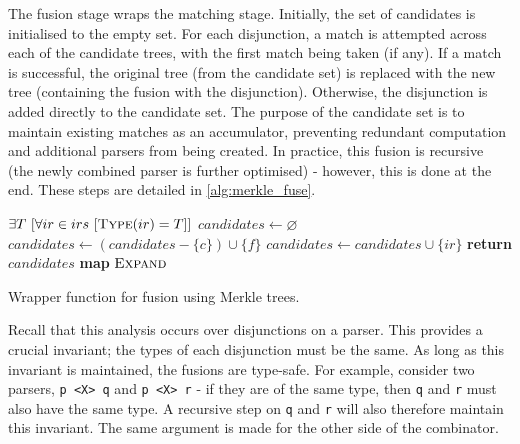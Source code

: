 The fusion stage wraps the matching stage.
Initially, the set of candidates is initialised to the empty set.
For each disjunction, a match is attempted across each of the candidate trees, with the first match being taken (if any).
If a match is successful, the original tree (from the candidate set) is replaced with the new tree (containing the fusion with the disjunction).
Otherwise, the disjunction is added directly to the candidate set.
The purpose of the candidate set is to maintain existing matches as an accumulator, preventing redundant computation and additional parsers from being created.
In practice, this fusion is recursive (the newly combined parser is further optimised) - however, this is done at the end.
These steps are detailed in \autoref{alg:merkle_fuse}.

\begin{algorithm}[H]
    \begin{algorithmic}[1]
        \Require $\exists T\ [\forall ir \in irs\ [\text{\sc Type}(ir) = T]]$ 
         
            \State $candidates \gets \varnothing$
                    \State $candidates \gets (candidates - \{ c \}) \cup \{ f \}$
                \Else
                    \State $candidates \gets candidates \cup \{ ir \}$
                \EndIf
            \EndFor
            \State \textbf{return} $candidates$ \textbf{map} $\text{\sc Expand}$ 
        \EndFunction
    \end{algorithmic}
    \caption{Wrapper function for fusion using Merkle trees.}
    \label{alg:merkle_fuse}
\end{algorithm}

Recall that this analysis occurs over disjunctions on a parser.
This provides a crucial invariant; the types of each disjunction must be the same.
As long as this invariant is maintained, the fusions are type-safe.
For example, consider two parsers, \texttt{p <X> q} and \texttt{p <X> r} - if they are of the same type, then \texttt{q} and \texttt{r} must also have the same type.
A recursive step on \texttt{q} and \texttt{r} will also therefore maintain this invariant.
The same argument is made for the other side of the combinator.

